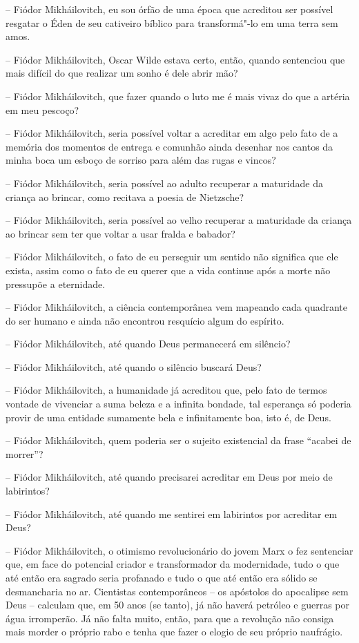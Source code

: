-- Fiódor Mikháilovitch, eu sou órfão de uma época que acreditou ser
possível resgatar o Éden de seu cativeiro bíblico para transformá"-lo em
uma terra sem amos.

-- Fiódor Mikháilovitch, Oscar Wilde estava certo, então, quando
sentenciou que mais difícil do que realizar um sonho é dele abrir mão?

-- Fiódor Mikháilovitch, que fazer quando o luto me é mais vivaz do que
a artéria em meu pescoço?

-- Fiódor Mikháilovitch, seria possível voltar a acreditar em algo pelo
fato de a memória dos momentos de entrega e comunhão ainda desenhar nos
cantos da minha boca um esboço de sorriso para além das rugas e vincos?

-- Fiódor Mikháilovitch, seria possível ao adulto recuperar a maturidade
da criança ao brincar, como recitava a poesia de Nietzsche?

-- Fiódor Mikháilovitch, seria possível ao velho recuperar a maturidade
da criança ao brincar sem ter que voltar a usar fralda e babador?

-- Fiódor Mikháilovitch, o fato de eu perseguir um sentido não significa
que ele exista, assim como o fato de eu querer que a vida continue após
a morte não pressupõe a eternidade.

-- Fiódor Mikháilovitch, a ciência contemporânea vem mapeando cada
quadrante do ser humano e ainda não encontrou resquício algum do
espírito.

-- Fiódor Mikháilovitch, até quando Deus permanecerá em silêncio?

-- Fiódor Mikháilovitch, até quando o silêncio buscará Deus?

-- Fiódor Mikháilovitch, a humanidade já acreditou que, pelo fato de
termos vontade de vivenciar a suma beleza e a infinita bondade, tal
esperança só poderia provir de uma entidade sumamente bela e
infinitamente boa, isto é, de Deus.

-- Fiódor Mikháilovitch, quem poderia ser o sujeito existencial da frase
``acabei de morrer''?

-- Fiódor Mikháilovitch, até quando precisarei acreditar em Deus por
meio de labirintos?

-- Fiódor Mikháilovitch, até quando me sentirei em labirintos por
acreditar em Deus?

-- Fiódor Mikháilovitch, o otimismo revolucionário do jovem Marx o fez
sentenciar que, em face do potencial criador e transformador da
modernidade, tudo o que até então era sagrado seria profanado e tudo o
que até então era sólido se desmancharia no ar. Cientistas
contemporâneos -- os apóstolos do apocalipse sem Deus -- calculam que,
em 50 anos (se tanto), já não haverá petróleo e guerras por água
irromperão. Já não falta muito, então, para que a revolução não consiga
mais morder o próprio rabo e tenha que fazer o elogio de seu próprio
naufrágio.

